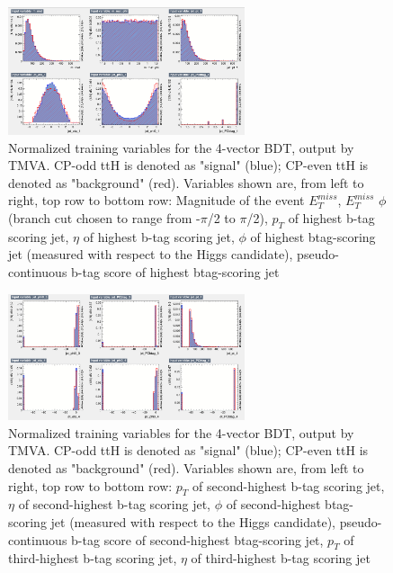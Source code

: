 \begin{figure}[htbp]
  \centering
  \includegraphics[width=0.62\textwidth]{figures/TMVABDTStudies/semilep-vbls4vec/semilep4vecvbls2.png}
  \caption{Normalized training variables for the 4-vector BDT, output by TMVA. CP-odd ttH is denoted as "signal" (blue); CP-even ttH is denoted as "background" (red). Variables shown are, from left to right, top row to bottom row: Magnitude of the event $E_T^{miss}$, $E_T^{miss}$ $\phi$ (branch cut chosen to range from -$\pi$/2 to $\pi$/2), $p_{T}$ of highest b-tag scoring jet, $\eta$ of highest b-tag scoring jet, $\phi$ of highest btag-scoring jet (measured with respect to the Higgs candidate), pseudo-continuous b-tag score of highest btag-scoring jet}
  \label{fig:semilep4vecvbls2}
\end{figure}

\begin{figure}[htbp]
  \centering
  \includegraphics[width=0.62\textwidth]{figures/TMVABDTStudies/semilep-vbls4vec/semilep4vecvbls4.png}
  \caption{Normalized training variables for the 4-vector BDT, output by TMVA. CP-odd ttH is denoted as "signal" (blue); CP-even ttH is denoted as "background" (red). Variables shown are, from left to right, top row to bottom row: $p_{T}$ of second-highest b-tag scoring jet, $\eta$ of second-highest b-tag scoring jet, $\phi$ of second-highest btag-scoring jet (measured with respect to the Higgs candidate), pseudo-continuous b-tag score of second-highest btag-scoring jet, $p_{T}$ of third-highest b-tag scoring jet, $\eta$ of third-highest b-tag scoring jet}
  \label{fig:semilep4vecvbls4}
\end{figure}

